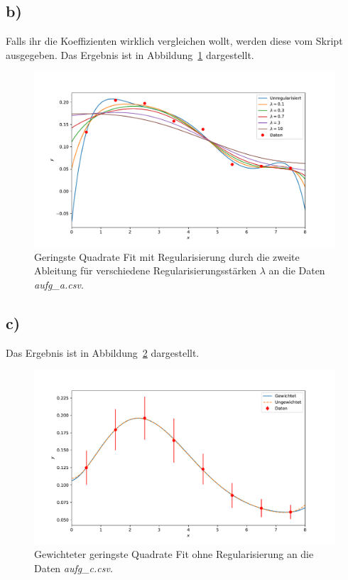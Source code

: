 \documentclass[a4paper, 11pt]{article}
\begin{document}
\subsection*{b)}
Falls ihr die Koeffizienten wirklich vergleichen wollt, werden diese vom Skript ausgegeben. Das Ergebnis ist in Abbildung~\ref{fig:31b} dargestellt.
\begin{figure}
    \centering
    \includegraphics[width=\textwidth]{../A31/A31b.pdf}
    \caption{Geringste Quadrate Fit mit Regularisierung durch die zweite Ableitung für verschiedene Regularisierungsstärken $\lambda$ an die Daten \textit{aufg\_a.csv}.}
    \label{fig:31b}
\end{figure}
\FloatBarrier

\subsection*{c)}
Das Ergebnis ist in Abbildung~\ref{fig:31c} dargestellt.
\begin{figure}
    \centering
    \includegraphics[width=\textwidth]{../A31/A31c.pdf}
    \caption{Gewichteter geringste Quadrate Fit ohne Regularisierung an die Daten \textit{aufg\_c.csv}.}
    \label{fig:31c}
\end{figure}
\FloatBarrier
\end{document}

